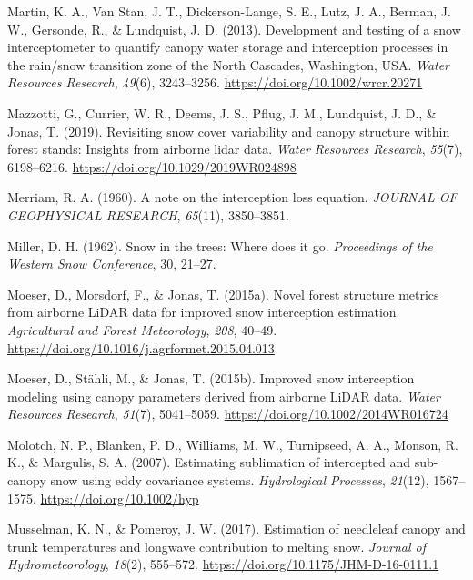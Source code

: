 \documentclass[
  letterpaper,
]{tex/uofsthesis-cs}
\newlength{\cslhangindent}
\newenvironment{CSLReferences}[2] %
 {\begin{list}{}{%
  \setlength{\itemindent}{0pt}
  \setlength{\leftmargin}{0pt}
  \setlength{\parsep}{0pt}
  \ifodd #1
   \setlength{\leftmargin}{\cslhangindent}
   \setlength{\itemindent}{-1\cslhangindent}
  \fi
  \setlength{\itemsep}{#2\baselineskip}}}
 {\end{list}}
\begin{document}
\begin{CSLReferences}{1}{0}
Martin, K. A., Van Stan, J. T., Dickerson-Lange, S. E., Lutz, J. A.,
Berman, J. W., Gersonde, R., \& Lundquist, J. D. (2013). Development and
testing of a snow interceptometer to quantify canopy water storage and
interception processes in the rain/snow transition zone of the {North
Cascades}, {Washington}, {USA}. \emph{Water Resources Research},
\emph{49}(6), 3243--3256. \url{https://doi.org/10.1002/wrcr.20271}

Mazzotti, G., Currier, W. R., Deems, J. S., Pflug, J. M., Lundquist, J.
D., \& Jonas, T. (2019). Revisiting snow cover variability and canopy
structure within forest stands: {Insights} from airborne lidar data.
\emph{Water Resources Research}, \emph{55}(7), 6198--6216.
\url{https://doi.org/10.1029/2019WR024898}

Merriam, R. A. (1960). A note on the interception loss equation.
\emph{JOURNAL OF GEOPHYSICAL RESEARCH}, \emph{65}(11), 3850--3851.

Miller, D. H. (1962). Snow in the trees: {Where} does it go.
\emph{Proceedings of the Western Snow Conference}, 30, 21--27.

Moeser, D., Morsdorf, F., \& Jonas, T. (2015a). Novel forest structure
metrics from airborne {LiDAR} data for improved snow interception
estimation. \emph{Agricultural and Forest Meteorology}, \emph{208},
40--49. \url{https://doi.org/10.1016/j.agrformet.2015.04.013}

Moeser, D., Stähli, M., \& Jonas, T. (2015b). Improved snow interception
modeling using canopy parameters derived from airborne {LiDAR} data.
\emph{Water Resources Research}, \emph{51}(7), 5041--5059.
\url{https://doi.org/10.1002/2014WR016724}

Molotch, N. P., Blanken, P. D., Williams, M. W., Turnipseed, A. A.,
Monson, R. K., \& Margulis, S. A. (2007). Estimating sublimation of
intercepted and sub-canopy snow using eddy covariance systems.
\emph{Hydrological Processes}, \emph{21}(12), 1567--1575.
\url{https://doi.org/10.1002/hyp}

Musselman, K. N., \& Pomeroy, J. W. (2017). Estimation of needleleaf
canopy and trunk temperatures and longwave contribution to melting snow.
\emph{Journal of Hydrometeorology}, \emph{18}(2), 555--572.
\url{https://doi.org/10.1175/JHM-D-16-0111.1}


\end{CSLReferences}
\end{document}

